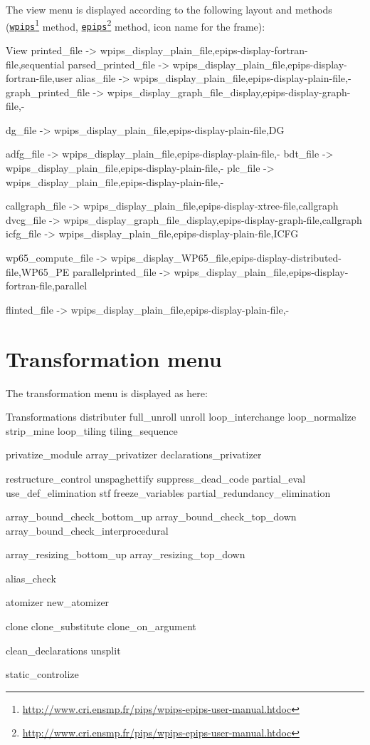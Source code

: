 \documentclass[a4paper]{report}
\newcommand{\LINK}[2]{\href{#2}{#1}\footnote{\url{#2}}\xspace}
\newcommand{\EPIPS}{\LINK{\texttt{epips}}{http://www.cri.ensmp.fr/pips/wpips-epips-user-manual.htdoc}}
\newcommand{\WPIPS}{\LINK{\texttt{wpips}}{http://www.cri.ensmp.fr/pips/wpips-epips-user-manual.htdoc}}
\begin{document}
The view menu is displayed according to the following layout and
methods (\WPIPS{} method, \EPIPS{} method, icon name for the frame):
\begin{PipsMenu}{View}
  printed_file -> wpips_display_plain_file,epips-display-fortran-file,sequential
  parsed_printed_file -> wpips_display_plain_file,epips-display-fortran-file,user
  alias_file -> wpips_display_plain_file,epips-display-plain-file,-
  graph_printed_file -> wpips_display_graph_file_display,epips-display-graph-file,-

  dg_file -> wpips_display_plain_file,epips-display-plain-file,DG

  adfg_file -> wpips_display_plain_file,epips-display-plain-file,-
  bdt_file -> wpips_display_plain_file,epips-display-plain-file,-
  plc_file -> wpips_display_plain_file,epips-display-plain-file,-

  callgraph_file -> wpips_display_plain_file,epips-display-xtree-file,callgraph
  dvcg_file -> wpips_display_graph_file_display,epips-display-graph-file,callgraph
  icfg_file -> wpips_display_plain_file,epips-display-plain-file,ICFG

  wp65_compute_file -> wpips_display_WP65_file,epips-display-distributed-file,WP65_PE
  parallelprinted_file -> wpips_display_plain_file,epips-display-fortran-file,parallel

  flinted_file -> wpips_display_plain_file,epips-display-plain-file,-
\end{PipsMenu}%


\section{Transformation menu}
\label{sec:transformation_menu}

The transformation menu is displayed as here:
\begin{PipsMenu}{Transformations}
  distributer
  full_unroll
  unroll
  loop_interchange
  loop_normalize
  strip_mine
  loop_tiling
  tiling_sequence

  privatize_module
  array_privatizer
  declarations_privatizer

  restructure_control
  unspaghettify
  suppress_dead_code
  partial_eval
  use_def_elimination
  stf
  freeze_variables
  partial_redundancy_elimination

  array_bound_check_bottom_up
  array_bound_check_top_down
  array_bound_check_interprocedural

  array_resizing_bottom_up
  array_resizing_top_down

  alias_check

  atomizer
  new_atomizer

  clone
  clone_substitute
  clone_on_argument

  clean_declarations
  unsplit

  static_controlize
\end{PipsMenu}%
\end{document}
